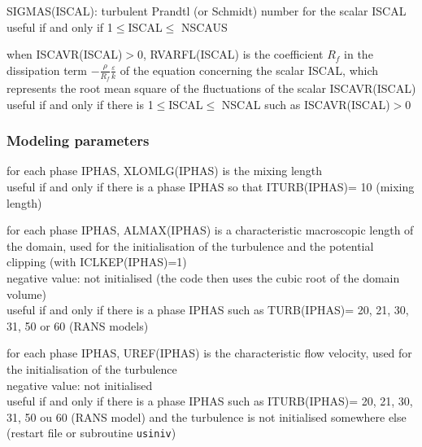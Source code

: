 {SIGMAS(ISCAL): turbulent Prandtl (or Schmidt) number for the scalar ISCAL\\
useful if and only if  1$\leqslant$ISCAL$\leqslant$ NSCAUS}

{when ISCAVR(ISCAL)$>$0, RVARFL(ISCAL) is the coefficient $R_f$ in the
dissipation term $\displaystyle -\frac{\rho}{R_f}\frac{\varepsilon}{k}$
of the equation concerning the scalar ISCAL,
which represents the root mean square of the
fluctuations of the scalar ISCAVR(ISCAL)\\
useful if and only if there is 1$\leqslant$ISCAL$\leqslant$ NSCAL such as
 ISCAVR(ISCAL)$>$0}


\subsubsection{Modeling parameters}

{for each phase IPHAS, XLOMLG(IPHAS) is the mixing length\\
useful if and only if there is a phase IPHAS so that ITURB(IPHAS)= 10
(mixing length)}

{for each phase IPHAS, ALMAX(IPHAS) is a characteristic macroscopic
length of the domain, used for the initialisation of the turbulence and
the potential clipping (with ICLKEP(IPHAS)=1)\\
negative value: not initialised (the code then uses the cubic root of
the domain volume)\\
useful if and only if there is a phase IPHAS such as
TURB(IPHAS)= 20, 21, 30, 31, 50 or 60 (RANS models)}

{for each phase IPHAS, UREF(IPHAS) is the characteristic flow velocity,
used for the initialisation of the turbulence\\
negative value: not initialised\\
useful if and only if there is a phase IPHAS such as
ITURB(IPHAS)= 20, 21, 30, 31, 50 ou 60 (RANS model)
and the turbulence is not initialised somewhere
else (restart file or subroutine \texttt{usiniv})}



